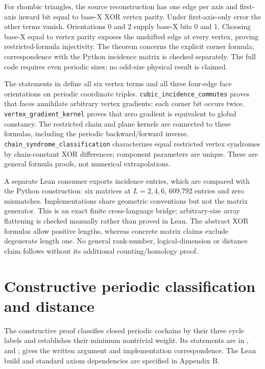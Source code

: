 For rhombic triangles, the source reconstruction has one edge per axis and first-axis inward bit equal to base-X XOR vertex parity. Under first-axis-only error the other terms vanish. Orientations 0 and 2 supply base-X bits 0 and 1. Choosing base-X equal to vertex parity exposes the unshifted edge at every vertex, proving restricted-formula injectivity. The theorem concerns the explicit corner formula; correspondence with the Python incidence matrix is checked separately. The full code requires even periodic sizes; no odd-size physical result is claimed.

The statements in  define all six vertex terms and all three four-edge face orientations on periodic coordinate triples. \nolinkurl{cubic_incidence_commutes} proves that faces annihilate arbitrary vertex gradients: each corner bit occurs twice. \nolinkurl{vertex_gradient_kernel} proves that zero gradient is equivalent to global constancy. The restricted chain and plane kernels are connected to these formulas, including the periodic backward/forward inverse. \nolinkurl{chain_syndrome_classification} characterizes equal restricted vertex syndromes by chain-constant XOR differences; component parameters are unique. These are general formula proofs, not numerical extrapolations.

A separate Lean consumer exports incidence entries, which are compared with the Python construction: six matrices at $L=2,4,6$, 609,792 entries and zero mismatches. Implementations share geometric conventions but not the matrix generator. This is an exact finite cross-language bridge; arbitrary-size array flattening is checked manually rather than proved in Lean. The abstract XOR formulas allow positive lengths, whereas concrete matrix claims exclude degenerate length one. No general rank-number, logical-dimension or distance claim follows without its additional counting/homology proof.

\section{Constructive periodic classification and distance}
The constructive proof classifies closed periodic cochains by their three cycle labels and establishes their minimum nontrivial weight. Its statements are in ,  and ;  gives the written argument and implementation correspondence. The Lean build and standard axiom dependencies are specified in Appendix B.

